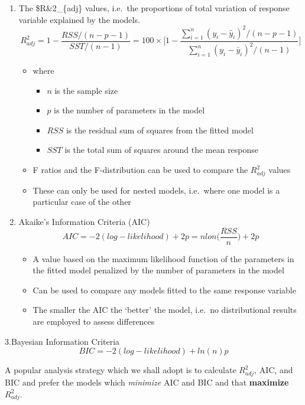 \documentclass[]{article}
\providecommand{\tightlist}{%
  \setlength{\itemsep}{0pt}\setlength{\parskip}{0pt}}
\begin{document}
\begin{enumerate}
\def\labelenumi{\arabic{enumi}.}
\tightlist
\item
  The \$R\&2\_\{adj\} values, i.e.~the proportions of total variation of
  response variable explained by the models.
  \[R^2_{adj} = 1 - \frac{RSS/(n-p-1)}{SST/(n-1)} = 100 \times \Bigg[ 1 - \frac{ \sum^n_{i=1} (y_i - \hat{y}_i)^2 / (n-p-1)}{ \sum^n_{i=1} (y_i - \bar{y}_i)^2 / (n-1)} \Bigg]\]

  \begin{itemize}
  \tightlist
  \item
    where

    \begin{itemize}
    \tightlist
    \item
      \(n\) is the sample size
    \item
      \(p\) is the number of parameters in the model
    \item
      \(RSS\) is the residual sum of squares from the fitted model
    \item
      \(SST\) is the total sum of squares around the mean response
    \end{itemize}
  \item
    F ratios and the F-distribution can be used to compare the
    \(R^2_{adj}\) values
  \item
    These can only be used for nested models, i.e.~where one model is a
    particular case of the other
  \end{itemize}
\item
  Akaike's Information Criteria (AIC)
  \[AIC = -2(log-likelihood) + 2p = nlon \Bigg( \frac{RSS}{n} \Bigg) + 2p\]

  \begin{itemize}
  \tightlist
  \item
    A value based on the maximum likelihood function of the parameters
    in the fitted model penalized by the number of parameters in the
    model
  \item
    Can be used to compare any models fitted to the same response
    variable
  \item
    The smaller the AIC the `better' the model, i.e.~no distributional
    results are employed to assess differences
  \end{itemize}
\end{enumerate}

3.Bayesian Information Criteria \[BIC = -2(log-likelihood) + ln(n)p\]

A popular analysis strategy which we shall adopt is to calculate
\(R^2_{adj}\), AIC, and BIC and prefer the models which \emph{minimize}
AIC and BIC and that \textbf{maximize} \(R^2_{adj}\).
\end{document}
